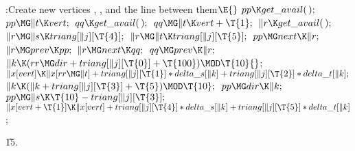 \B{}:Create new vertices , , and
the line  between them\X${}\E{}$\6
$\\{pp}\K\\{get\_avail}(\,);{}$\6
${}\\{pp}\MG\|t\K\\{vert};{}$\6
${}\\{qq}\K\\{get\_avail}(\,);{}$\6
${}\\{qq}\MG\|t\K\\{vert}+\T{1};{}$\6
${}\|r\K\\{get\_avail}(\,);{}$\6
${}\|r\MG\|s\K\\{triang}[\|j][\T{4}];{}$\6
${}\|r\MG\|t\K\\{triang}[\|j][\T{5}];{}$\6
${}\\{pp}\MG\\{next}\K\|r;{}$\6
${}\|r\MG\\{prev}\K\\{pp};{}$\6
${}\|r\MG\\{next}\K\\{qq};{}$\6
${}\\{qq}\MG\\{prev}\K\|r;{}$\6
${}\|k\K(\\{rr}\MG\\{dir}+\\{triang}[\|j][\T{0}]+\T{100})\MOD\T{10}{}$;\6
${}\|x[\\{vert}]\K\|x[\\{rr}\MG\|t]+\\{triang}[\|j][\T{1}]*\\{delta\_s}[\|k]+%
\\{triang}[\|j][\T{2}]*\\{delta\_t}[\|k];{}$\6
${}\|k\K(\|k+\\{triang}[\|j][\T{3}]+\T{5})\MOD\T{10};{}$\6
${}\\{pp}\MG\\{dir}\K\|k;{}$\6
${}\\{pp}\MG\|s\K\T{10}-\\{triang}[\|j][\T{3}];{}$\6
${}\|x[\\{vert}+\T{1}]\K\|x[\\{vert}]+\\{triang}[\|j][\T{4}]*\\{delta\_s}[\|k]+%
\\{triang}[\|j][\T{5}]*\\{delta\_t}[\|k]{}$;\par
\U15.\fi

